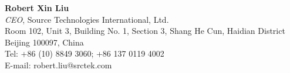 \documentclass[letterpaper,11pt]{article}
\newcommand{\resheading}[1]{{\noindent\large \colorbox{mygrey}{
\begin{minipage}{1.0\textwidth}{\textsc{#1 \vphantom{p\^{E}}}}\end{minipage}}}}
\begin{document}
\vspace{0.2in}%
\textbf{Robert Xin Liu}\\
\textit{CEO}, Source Technologies International, Ltd.\\
Room 102, Unit 3, Building No. 1, Section 3, Shang He Cun, Haidian District\\
Beijing 100097, China\\
Tel: +86 (10) 8849 3060; +86 137 0119 4002\\
E-mail: robert.liu@srctek.com\\



%
%







\end{document}

